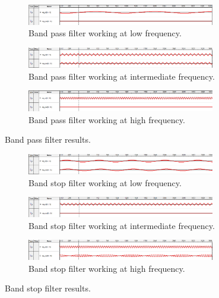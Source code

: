 \documentclass[12pt]{article}   	%
\begin{document}
\begin{figure}[!ht]
	\centering
	\begin{subfigure}[t]{\textwidth}
		\centering
		\includegraphics[width=0.9\textwidth]{img/bp_lf}
		\caption{Band pass filter working at low frequency.}
		\label{fig:bp_lf}
	\end{subfigure}%
	\hfill
	\begin{subfigure}[t]{\textwidth}
		\centering
		\includegraphics[width=0.9\textwidth]{img/bp_mf}
		\caption{Band pass filter working at intermediate frequency.}
		\label{fig:bp_mf}
	\end{subfigure}%
	\hfill
	\begin{subfigure}[t]{\textwidth}
		\centering
		\includegraphics[width=0.9\textwidth]{img/bp_hf}
		\caption{Band pass filter working at high frequency.}
		\label{fig:bp_hf}
	\end{subfigure}%
	\caption{Band pass filter results.}
	\label{fig:bpr}
\end{figure}


\begin{figure}[!ht]
	\centering
	\begin{subfigure}[t]{\textwidth}
		\centering
		\includegraphics[width=0.9\textwidth]{img/bs_lf}
		\caption{Band stop filter working at low frequency.}
		\label{fig:bs_lf}
	\end{subfigure}%
	\hfill
	\begin{subfigure}[t]{\textwidth}
		\centering
		\includegraphics[width=0.9\textwidth]{img/bs_mf}
		\caption{Band stop filter working at intermediate frequency.}
		\label{fig:bs_mf}
	\end{subfigure}%
	\hfill
	\begin{subfigure}[t]{\textwidth}
		\centering
		\includegraphics[width=0.9\textwidth]{img/bs_hf}
		\caption{Band stop filter working at high frequency.}
		\label{fig:bs_hf}
	\end{subfigure}%
	\caption{Band stop filter results.}
	\label{fig:bsr}
\end{figure}
\end{document}
